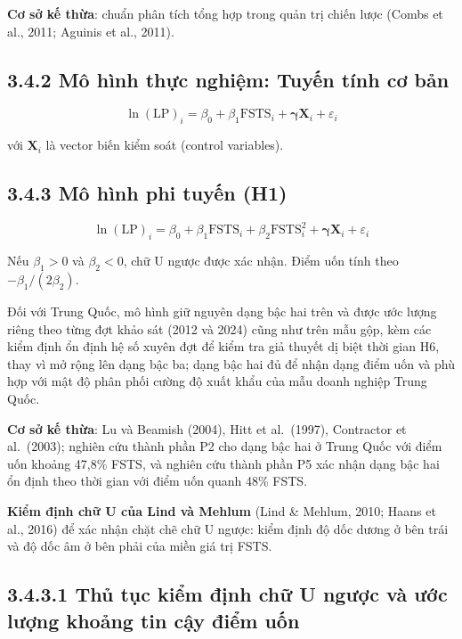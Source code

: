\documentclass[
  a4paper,
  13pt]{extreport}
\begin{document}
\textbf{Cơ sở kế thừa}: chuẩn phân tích tổng hợp trong quản trị chiến
lược (Combs et al., 2011; Aguinis et al., 2011).

\hypertarget{muxf4-huxecnh-thux1ef1c-nghiux1ec7m-tuyux1ebfn-tuxednh-cux1a1-bux1ea3n}{%
\subsection{3.4.2 Mô hình thực nghiệm: Tuyến tính cơ
bản}\label{muxf4-huxecnh-thux1ef1c-nghiux1ec7m-tuyux1ebfn-tuxednh-cux1a1-bux1ea3n}}

\[\ln(\mathrm{LP})_i = \beta_0 + \beta_1 \mathrm{FSTS}_i + \boldsymbol{\gamma} \mathbf{X}_i + \varepsilon_i\]

với \(\mathbf{X}_i\) là vector biến kiểm soát (control variables).

\hypertarget{muxf4-huxecnh-phi-tuyux1ebfn-h1}{%
\subsection{3.4.3 Mô hình phi tuyến
(H1)}\label{muxf4-huxecnh-phi-tuyux1ebfn-h1}}

\[\ln(\mathrm{LP})_i = \beta_0 + \beta_1 \mathrm{FSTS}_i + \beta_2 \mathrm{FSTS}_i^{2} + \boldsymbol{\gamma} \mathbf{X}_i + \varepsilon_i\]

Nếu \(\beta_1 > 0\) và \(\beta_2 < 0\), chữ U ngược được xác nhận. Điểm
uốn tính theo \(-\beta_1 / (2\beta_2)\).

Đối với Trung Quốc, mô hình giữ nguyên dạng bậc hai trên và được ước
lượng riêng theo từng đợt khảo sát (2012 và 2024) cũng như trên mẫu gộp,
kèm các kiểm định ổn định hệ số xuyên đợt để kiểm tra giả thuyết dị biệt
thời gian H6, thay vì mở rộng lên dạng bậc ba; dạng bậc hai đủ để nhận
dạng điểm uốn và phù hợp với mật độ phân phối cường độ xuất khẩu của mẫu
doanh nghiệp Trung Quốc.

\textbf{Cơ sở kế thừa}: Lu và Beamish (2004), Hitt et al.~(1997),
Contractor et al.~(2003); nghiên cứu thành phần P2 cho dạng bậc hai ở
Trung Quốc với điểm uốn khoảng 47,8\% FSTS, và nghiên cứu thành phần P5
xác nhận dạng bậc hai ổn định theo thời gian với điểm uốn quanh 48\%
FSTS.

\textbf{Kiểm định chữ U của Lind và Mehlum} (Lind \& Mehlum, 2010; Haans
et al., 2016) để xác nhận chặt chẽ chữ U ngược: kiểm định độ dốc dương ở
bên trái và độ dốc âm ở bên phải của miền giá trị FSTS.

\hypertarget{thux1ee7-tux1ee5c-kiux1ec3m-ux111ux1ecbnh-chux1eef-u-ngux1b0ux1ee3c-vuxe0-ux1b0ux1edbc-lux1b0ux1ee3ng-khoux1ea3ng-tin-cux1eady-ux111iux1ec3m-uux1ed1n}{%
\subsection{3.4.3.1 Thủ tục kiểm định chữ U ngược và ước lượng khoảng
tin cậy điểm
uốn}\label{thux1ee7-tux1ee5c-kiux1ec3m-ux111ux1ecbnh-chux1eef-u-ngux1b0ux1ee3c-vuxe0-ux1b0ux1edbc-lux1b0ux1ee3ng-khoux1ea3ng-tin-cux1eady-ux111iux1ec3m-uux1ed1n}}
\end{document}
